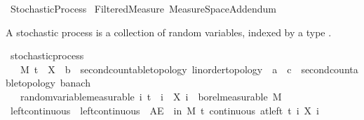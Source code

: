 %
\begin{isabellebody}%
%
%
\isadelimtheory
%
\endisadelimtheory
%
\isatagtheory
{}\isamarkupfalse%
\ Stochastic{\isacharunderscore}{\kern0pt}Process\isanewline
{}\ Filtered{\isacharunderscore}{\kern0pt}Measure\ Measure{\isacharunderscore}{\kern0pt}Space{\isacharunderscore}{\kern0pt}Addendum\isanewline
{}%
\endisatagtheory
{\isafoldtheory}%
%
\isadelimtheory
%
\endisadelimtheory
%
\isadelimdocument
%
\endisadelimdocument
%
\isatagdocument
%
\isamarkuptrue%
%
\isamarkuptrue%
%
\endisatagdocument
{\isafolddocument}%
%
\isadelimdocument
%
\endisadelimdocument
%
\begin{isamarkuptext}%
A stochastic process is a collection of random variables, indexed by a type .%
\end{isamarkuptext}\isamarkuptrue%
\isamarkupfalse%
\ stochastic{\isacharunderscore}{\kern0pt}process\ {\isacharequal}{\kern0pt}\isanewline
\ \ \ M\ t\ \ X\ {\isacharcolon}{\kern0pt}{\isacharcolon}{\kern0pt}\ {\isachardoublequoteopen}{\isacharprime}{\kern0pt}b\ {\isacharcolon}{\kern0pt}{\isacharcolon}{\kern0pt}\ {\isacharbraceleft}{\kern0pt}second{\isacharunderscore}{\kern0pt}countable{\isacharunderscore}{\kern0pt}topology{\isacharcomma}{\kern0pt}\ linorder{\isacharunderscore}{\kern0pt}topology{\isacharbraceright}{\kern0pt}\ {\isasymRightarrow}\ {\isacharprime}{\kern0pt}a\ {\isasymRightarrow}\ {\isacharprime}{\kern0pt}c\ {\isacharcolon}{\kern0pt}{\isacharcolon}{\kern0pt}\ {\isacharbraceleft}{\kern0pt}second{\isacharunderscore}{\kern0pt}countable{\isacharunderscore}{\kern0pt}topology{\isacharcomma}{\kern0pt}\ banach{\isacharbraceright}{\kern0pt}{\isachardoublequoteclose}\isanewline
\ \ \ random{\isacharunderscore}{\kern0pt}variable{\isacharbrackleft}{\kern0pt}measurable{\isacharbrackright}{\kern0pt}{\isacharcolon}{\kern0pt}\ {\isachardoublequoteopen}{\isasymAnd}i{\isachardot}{\kern0pt}\ t\ {\isasymle}\ i\ {\isasymLongrightarrow}\ X\ i\ {\isasymin}\ borel{\isacharunderscore}{\kern0pt}measurable\ M{\isachardoublequoteclose}\isanewline
{}\isanewline
\isanewline
{}\isamarkupfalse%
\ left{\isacharunderscore}{\kern0pt}continuous\ \ {\isachardoublequoteopen}left{\isacharunderscore}{\kern0pt}continuous\ {\isacharequal}{\kern0pt}\ {\isacharparenleft}{\kern0pt}AE\ {\isasymxi}\ in\ M{\isachardot}{\kern0pt}\ {\isasymforall}t{\isachardot}{\kern0pt}\ continuous\ {\isacharparenleft}{\kern0pt}at{\isacharunderscore}{\kern0pt}left\ t{\isacharparenright}{\kern0pt}\ {\isacharparenleft}{\kern0pt}{\isasymlambda}i{\isachardot}{\kern0pt}\ X\ i\ {\isasymxi}{\isacharparenright}{\kern0pt}{\isacharparenright}{\kern0pt}{\isachardoublequoteclose}\isanewline

\end{isabellebody}
